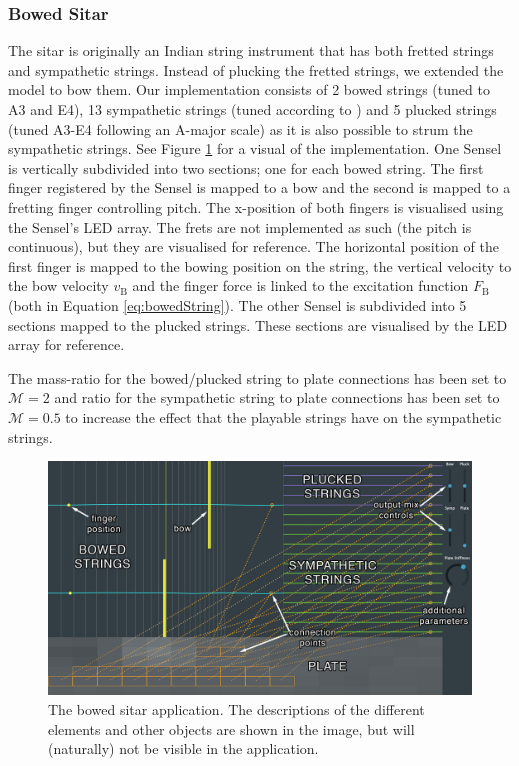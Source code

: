 \documentclass{article}
\begin{document}
\subsubsection{Bowed Sitar}
The sitar is originally an Indian string instrument that has both fretted strings and sympathetic strings. Instead of plucking the fretted strings, we extended the model to bow them. Our implementation consists of 2 bowed strings (tuned to A3 and E4), 13 sympathetic strings (tuned according to \cite{sitarTuning}) and 5 plucked strings (tuned A3-E4 following an A-major scale) as it is also possible to strum the sympathetic strings. See Figure \ref{fig:bowedSitar} for a visual of the implementation. One Sensel is vertically subdivided into two sections; one for each bowed string. The first finger registered by the Sensel is mapped to a bow and the second is mapped to a fretting finger controlling pitch. The x-position of both fingers is visualised using the Sensel's LED array. The frets are not implemented as such (the pitch is continuous), but they are visualised for reference. The horizontal position of the first finger is mapped to the bowing position on the string, the vertical velocity to the bow velocity $v_\text{B}$ and the finger force is linked to the excitation function $F_\text{B}$ (both in Equation \eqref{eq:bowedString}). The other Sensel is subdivided into 5 sections mapped to the plucked strings. These sections are visualised by the LED array for reference.

The mass-ratio for the bowed/plucked string to plate connections has been set to $\mathcal{M} = 2$ and ratio for the sympathetic string to plate connections has been set to $\mathcal{M} = 0.5$ to increase the effect that the playable strings have on the sympathetic strings.

\begin{figure}[h]
\centering
\includegraphics[width=1.0\columnwidth]{BowedSitar.png}
\caption{The bowed sitar application. The descriptions of the different elements and other objects are shown in the image, but will (naturally) not be visible in the application. \label{fig:bowedSitar}}
\end{figure}
\end{document}

